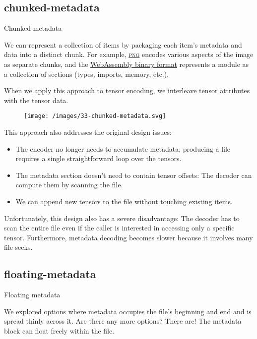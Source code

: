 \documentclass{article}
\begin{document}
\subsection{chunked-metadata}{Chunked metadata}

We can represent a collection of items by packaging each item's metadata and data into a distinct chunk.
For example,
\href{https://en.wikipedia.org/wiki/PNG#File_format}{\textsc{png}} encodes various aspects of the image as separate chunks,
and the \href{https://webassembly.github.io/spec/core/binary/index.html}{WebAssembly binary format} represents a module as a collection of sections (types, imports, memory, etc.).

When we apply this approach to tensor encoding,
we interleave tensor attributes with the tensor data.

\begin{figure}[grayscale-diagram]
\texttt{[image: /images/33-chunked-metadata.svg]}
\end{figure}

This approach also addresses the original design issues:
\begin{itemize}
\item The encoder no longer needs to accumulate metadata;
  producing a file requires a single straightforward loop over the tensors.
\item The metadata section doesn't need to contain tensor offsets:
  The decoder can compute them by scanning the file.
\item We can append new tensors to the file without touching existing items.
\end{itemize}

Unfortunately, this design also has a severe disadvantage:
The decoder has to scan the entire file even if the caller is interested in accessing only a specific tensor.
Furthermore, metadata decoding becomes slower because it involves many file seeks.

\subsection{floating-metadata}{Floating metadata}

We explored options where metadata occupies the file's beginning and end
and is spread thinly across it.
Are there any more options?
There are!
The metadata block can float freely within the file.
\end{document}

